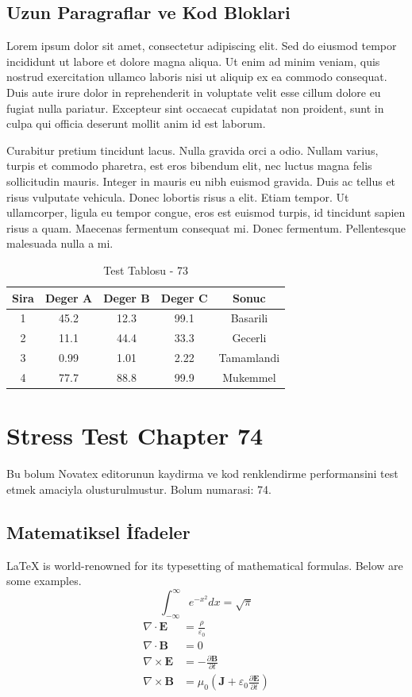 \documentclass[12pt,a4paper]{article}
\begin{document}
\subsection{Uzun Paragraflar ve Kod Bloklari}
Lorem ipsum dolor sit amet, consectetur adipiscing elit. Sed do eiusmod tempor incididunt ut labore et dolore magna aliqua. Ut enim ad minim veniam, quis nostrud exercitation ullamco laboris nisi ut aliquip ex ea commodo consequat. Duis aute irure dolor in reprehenderit in voluptate velit esse cillum dolore eu fugiat nulla pariatur. Excepteur sint occaecat cupidatat non proident, sunt in culpa qui officia deserunt mollit anim id est laborum.

Curabitur pretium tincidunt lacus. Nulla gravida orci a odio. Nullam varius, turpis et commodo pharetra, est eros bibendum elit, nec luctus magna felis sollicitudin mauris. Integer in mauris eu nibh euismod gravida. Duis ac tellus et risus vulputate vehicula. Donec lobortis risus a elit. Etiam tempor. Ut ullamcorper, ligula eu tempor congue, eros est euismod turpis, id tincidunt sapien risus a quam. Maecenas fermentum consequat mi. Donec fermentum. Pellentesque malesuada nulla a mi.

\begin{table}[h!]
\centering
\begin{tabular}{|c|c|c|c|c|}
\hline
\textbf{Sira} & \textbf{Deger A} & \textbf{Deger B} & \textbf{Deger C} & \textbf{Sonuc} \\
\hline
1 & 45.2 & 12.3 & 99.1 & Basarili \\
2 & 11.1 & 44.4 & 33.3 & Gecerli \\
3 & 0.99 & 1.01 & 2.22 & Tamamlandi \\
4 & 77.7 & 88.8 & 99.9 & Mukemmel \\
\hline
\end{tabular}
\caption{Test Tablosu - 73}
\end{table}

\newpage
\section{Stress Test Chapter 74}
Bu bolum Novatex editorunun kaydirma ve kod renklendirme performansini test etmek amaciyla olusturulmustur. Bolum numarasi: 74.

\subsection{Matematiksel İfadeler}
\LaTeX{} is world-renowned for its typesetting of mathematical formulas. Below are some examples.
\begin{equation}
\int_{-\infty}^{\infty} e^{-x^2} dx = \sqrt{\pi}
\end{equation}
\begin{align}
\nabla \cdot \mathbf{E} &= \frac{\rho}{\varepsilon_0} \\
\nabla \cdot \mathbf{B} &= 0 \\
\nabla \times \mathbf{E} &= -\frac{\partial \mathbf{B}}{\partial t} \\
\nabla \times \mathbf{B} &= \mu_0\left(\mathbf{J} + \varepsilon_0 \frac{\partial \mathbf{E}}{\partial t}\right)
\end{align}
\end{document}
